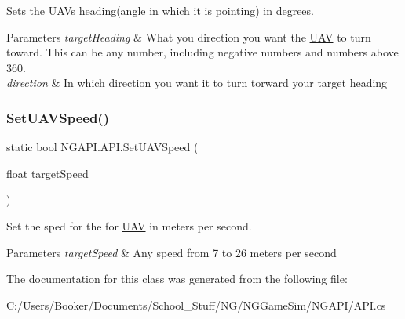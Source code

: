 Sets the \hyperlink{class_n_g_a_p_i_1_1_u_a_v}{U\+AV}\textquotesingle{}s heading(angle in which it is pointing) in degrees. 


\begin{DoxyParams}{Parameters}
{\em target\+Heading} & What you direction you want the \hyperlink{class_n_g_a_p_i_1_1_u_a_v}{U\+AV} to turn toward. This can be any number, including negative numbers and numbers above 360. \\
\hline
{\em direction} & In which direction you want it to turn torward your target heading \\
\hline
\end{DoxyParams}
\mbox{\label{class_n_g_a_p_i_1_1_a_p_i_a362ce9fec87f71fc8b93e8080f83653a}} 
\subsubsection{\texorpdfstring{Set\+U\+A\+V\+Speed()}{SetUAVSpeed()}}
{\footnotesize\ttfamily static bool N\+G\+A\+P\+I.\+A\+P\+I.\+Set\+U\+A\+V\+Speed (\begin{DoxyParamCaption}\item[{float}]{target\+Speed }\end{DoxyParamCaption})\hspace{0.3cm}{\ttfamily [static]}}



Set the sped for the for \hyperlink{class_n_g_a_p_i_1_1_u_a_v}{U\+AV} in meters per second. 


\begin{DoxyParams}{Parameters}
{\em target\+Speed} & Any speed from 7 to 26 meters per second \\
\hline
\end{DoxyParams}


The documentation for this class was generated from the following file\+:\begin{DoxyCompactItemize}
\item 
C\+:/\+Users/\+Booker/\+Documents/\+School\+\_\+\+Stuff/\+N\+G/\+N\+G\+Game\+Sim/\+N\+G\+A\+P\+I/A\+P\+I.\+cs\end{DoxyCompactItemize}
